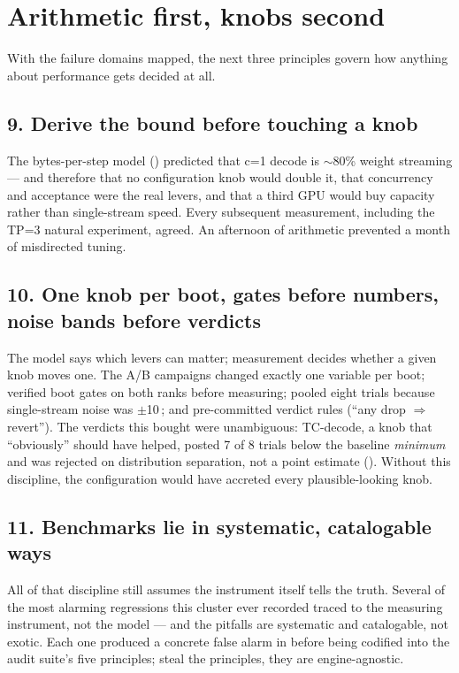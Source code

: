 \section{Arithmetic first, knobs second}

With the failure domains mapped, the next three principles govern how
anything about performance gets decided at all.

\subsection*{9. Derive the bound before touching a knob}
The bytes-per-step model () predicted that c=1 decode is
$\sim$80\% weight streaming --- and therefore that no configuration knob
would double it, that concurrency and acceptance were the real levers, and
that a third GPU would buy capacity rather than single-stream speed. Every
subsequent measurement, including the TP=3 natural experiment, agreed. An afternoon of
arithmetic prevented a month of misdirected tuning.

\subsection*{10. One knob per boot, gates before numbers, noise bands before verdicts}
The model says which levers can matter; measurement decides whether a given
knob moves one. The A/B campaigns changed exactly one variable per boot; verified boot gates
on both ranks before measuring; pooled eight trials because single-stream
noise was $\pm$10\,\tokspersec{}; and pre-committed verdict rules (``any drop
$\Rightarrow$ revert''). The verdicts this bought were unambiguous:
TC-decode, a knob that ``obviously'' should have helped, posted 7 of 8
trials below the baseline \emph{minimum} and was rejected on distribution
separation, not a point estimate (). Without this
discipline, the configuration would have accreted every plausible-looking
knob.

\subsection*{11. Benchmarks lie in systematic, catalogable ways}
All of that discipline still assumes the instrument itself tells the truth.
Several of the most alarming regressions this cluster ever recorded traced
to the measuring instrument, not the model --- and the pitfalls are
systematic and catalogable, not exotic. Each one produced a concrete false alarm in
 before being codified into the audit suite's five
principles; steal the principles, they are engine-agnostic.

